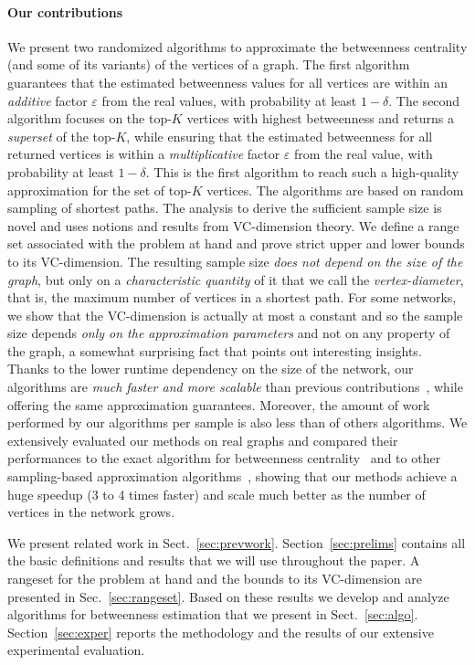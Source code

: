 \paragraph{Our contributions} 
We present two randomized algorithms to approximate the betweenness centrality
(and some of its variants) of the vertices of a graph. The first algorithm
guarantees that the estimated betweenness values for all vertices are within an
\emph{additive} factor $\varepsilon$ from the real values, with probability at
least $1-\delta$. The second algorithm focuses on the top-$K$ vertices with
highest betweenness and returns a \emph{superset} of the top-$K$,
while ensuring that the estimated betweenness for all returned vertices is
within a \emph{multiplicative} factor $\varepsilon$ from the real value, with
probability at least $1-\delta$. This is the first algorithm to reach such a
high-quality approximation for the set of top-$K$ vertices. The algorithms are
based on random sampling of shortest paths. The analysis to derive the
sufficient sample size is novel and uses notions and results from VC-dimension
theory. We define a range set associated with the problem at hand and prove strict
upper and lower bounds to its VC-dimension. The resulting sample size \emph{does not
depend on the size of the graph}, but only on a \emph{characteristic quantity} of it
that we call the \emph{vertex-diameter}, that is, the maximum number of vertices
in a shortest path. For some networks, we show that the VC-dimension is actually
at most a constant and so the sample size depends \emph{only on the approximation
parameters} and not on any property of the graph, a somewhat surprising fact
that points out interesting insights. Thanks to the lower runtime dependency on
the size of the network, our algorithms are \emph{much faster and more scalable}
than previous contributions~\citep{JacobKLPT05,BrandesP07,GeisbergerSS08}, while
offering the same approximation guarantees. Moreover, the amount of work
performed by our algorithms per sample is also less than of others algorithms.
We extensively evaluated our methods on real graphs and compared their
performances to the exact algorithm for betweenness centrality~\citep{Brandes01}
and to other sampling-based approximation
algorithms~\citep{JacobKLPT05,BrandesP07,GeisbergerSS08}, showing that our
methods achieve a huge speedup (3 to 4 times faster) and scale much better as
the number of vertices in the network grows.

We present related work in Sect.~\ref{sec:prevwork}. Section~\ref{sec:prelims}
contains all the basic definitions and results that we will use throughout the
paper. A rangeset for the problem at hand and the bounds to its VC-dimension
are presented in Sec.~\ref{sec:rangeset}. Based on these results we develop and
analyze algorithms for betweenness estimation that we present in
Sect.~\ref{sec:algo}. Section~\ref{sec:exper} reports the methodology and
the results of our extensive experimental evaluation.

